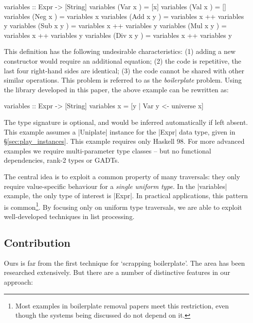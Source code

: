 \begin{code}
variables :: Expr -> [String]
variables (Var  x    ) = [x]
variables (Val  x    ) = []
variables (Neg  x    ) = variables x
variables (Add  x y  ) = variables x ++ variables y
variables (Sub  x y  ) = variables x ++ variables y
variables (Mul  x y  ) = variables x ++ variables y
variables (Div  x y  ) = variables x ++ variables y
\end{code}

This definition has the following undesirable characteristics: (1) adding a new constructor would require an additional equation; (2) the code is repetitive, the last four right-hand sides are identical; (3) the code cannot be shared with other similar operations. This problem is referred to as the \textit{boilerplate} problem. Using the library developed in this paper, the above example can be rewritten as:

\begin{code}
variables :: Expr -> [String]
variables x = [y | Var y <- universe x]
\end{code}

The type signature is optional, and would be inferred automatically if left absent. This example assumes a |Uniplate| instance for the |Expr| data type, given in \S\ref{sec:play_instances}. This example requires only Haskell 98. For more advanced examples we require multi-parameter type classes -- but no functional dependencies, rank-2 types or GADTs.

The central idea is to exploit a common property of many traversals: they only require value-specific behaviour for a \textit{single uniform type}. In the |variables| example, the only type of interest is |Expr|. In practical applications, this pattern is common\footnote{Most examples in boilerplate removal papers meet this restriction, even though the systems being discussed do not depend on it.}. By focusing only on uniform type traversals, we are able to exploit well-developed techniques in list processing.

\subsection{Contribution}

Ours is far from the first technique for `scrapping boilerplate'. The area has been researched extensively. But there are a number of distinctive features in our approach:

